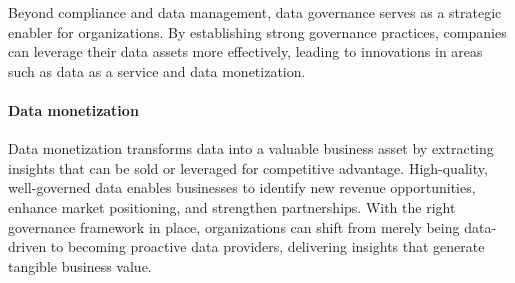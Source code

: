 Beyond compliance and data management, data governance serves as a strategic enabler for organizations. 
By establishing strong governance practices, companies can leverage their data assets more effectively, leading to innovations in areas such as data as a service and data monetization.

\paragraph*{Data monetization}
Data monetization transforms data into a valuable business asset by extracting insights that can be sold or leveraged for competitive advantage. 
High-quality, well-governed data enables businesses to identify new revenue opportunities, enhance market positioning, and strengthen partnerships.
With the right governance framework in place, organizations can shift from merely being data-driven to becoming proactive data providers, delivering insights that generate tangible business value.